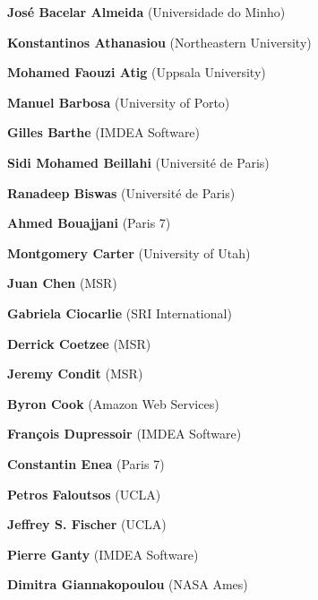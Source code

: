 \documentclass{article}
\begin{document}
  \begin{commalist}

    \item {\bf José Bacelar Almeida} (Universidade do Minho)


    \item {\bf Konstantinos Athanasiou} (Northeastern University)


    \item {\bf Mohamed Faouzi Atig} (Uppsala University)


    \item {\bf Manuel Barbosa} (University of Porto)


    \item {\bf Gilles Barthe} (IMDEA Software)


    \item {\bf Sidi Mohamed Beillahi} (Université de Paris)


    \item {\bf Ranadeep Biswas} (Université de Paris)


    \item {\bf Ahmed Bouajjani} (Paris 7)


    \item {\bf Montgomery Carter} (University of Utah)


    \item {\bf Juan Chen} (MSR)


    \item {\bf Gabriela Ciocarlie} (SRI International)


    \item {\bf Derrick Coetzee} (MSR)


    \item {\bf Jeremy Condit} (MSR)


    \item {\bf Byron Cook} (Amazon Web Services)


    \item {\bf François Dupressoir} (IMDEA Software)


    \item {\bf Constantin Enea} (Paris 7)


    \item {\bf Petros Faloutsos} (UCLA)


    \item {\bf Jeffrey S. Fischer} (UCLA)


    \item {\bf Pierre Ganty} (IMDEA Software)


    \item {\bf Dimitra Giannakopoulou} (NASA Ames)



\end{commalist}
\end{document}
